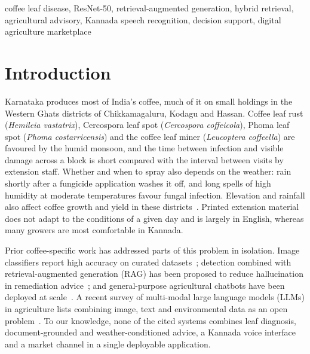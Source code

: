 \begin{IEEEkeywords}
coffee leaf disease, ResNet-50, retrieval-augmented generation, hybrid retrieval, agricultural advisory,
Kannada speech recognition, decision support, digital agriculture marketplace
\end{IEEEkeywords}

\section{Introduction}
Karnataka produces most of India's coffee, much of it on small holdings in the Western Ghats districts of
Chikkamagaluru, Kodagu and Hassan. Coffee leaf rust (\textit{Hemileia vastatrix}), Cercospora leaf spot
(\textit{Cercospora coffeicola}), Phoma leaf spot (\textit{Phoma costarricensis}) and the coffee leaf miner
(\textit{Leucoptera coffeella}) are favoured by the humid monsoon, and the time between infection and visible damage
across a block is short compared with the interval between visits by extension staff. Whether and when to spray also
depends on the weather: rain shortly after a fungicide application washes it off, and long spells of high humidity at
moderate temperatures favour fungal infection. Elevation and rainfall also affect coffee growth and yield in these
districts~\cite{patil2022elevation}. Printed extension material
does not adapt to the conditions of a given day and is largely in English, whereas many growers are most comfortable in
Kannada.

Prior coffee-specific work has addressed parts of this problem in isolation. Image classifiers report high accuracy on
curated datasets~\cite{anudeep2024cnn}; detection combined with retrieval-augmented generation (RAG) has been proposed
to reduce hallucination in remediation advice~\cite{selvakumar2024rag}; and general-purpose agricultural chatbots have
been deployed at scale~\cite{singh2024farmerchat}. A recent survey of multi-modal large language models (LLMs) in
agriculture lists combining image, text and environmental data as an open problem~\cite{sapkota2024mmllm}. To our knowledge, none of the cited systems combines leaf diagnosis, document-grounded
and weather-conditioned advice, a Kannada voice interface and a market channel in a single deployable application.

